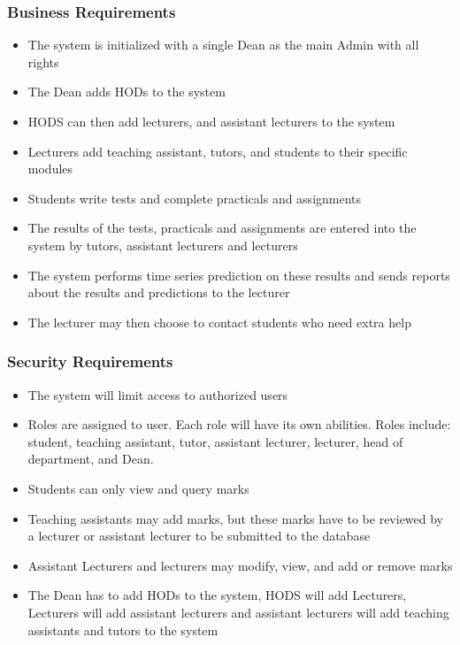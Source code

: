 \documentclass[a4paper,12pt]{article}
\begin{document}
        	\subsubsection{Business Requirements}
        	\begin{itemize}
        	\item The system is initialized with a single Dean as the main Admin with all rights
        	\item The Dean adds HODs to the system
        	\item HODS can then add lecturers, and assistant lecturers to the system
        	\item Lecturers add teaching assistant, tutors, and students to their specific modules
        	\item Students write tests and complete practicals and assignments
        	\item The results of the tests, practicals and assignments are entered into the system by tutors, assistant lecturers and lecturers
        	\item The system performs time series prediction on these results and sends reports about the results and predictions to the lecturer
        	\item The lecturer may then choose to contact students who need extra help
        	\end{itemize}
        	\subsubsection{Security Requirements}
        	\begin{itemize}
        	\item The system will limit access to authorized users
        	\item Roles are assigned to user. Each role will have its own abilities. Roles include: student, teaching assistant, tutor, assistant lecturer, lecturer, head of department, and Dean.
        	\item Students can only view and query marks
        	\item Teaching assistants may add marks, but these marks have to be reviewed by a lecturer or assistant lecturer to be submitted to the database
        	\item Assistant Lecturers and lecturers may modify, view, and add or remove marks
        	\item The Dean has to add HODs to the system, HODS will add Lecturers, Lecturers will add assistant lecturers and assistant lecturers will add teaching assistants and tutors to the system
        	\end{itemize}
        	
\end{document}
